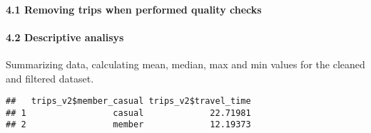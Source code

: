 \documentclass[
]{article}
\newenvironment{Shaded}{\begin{snugshade}}{\end{snugshade}}
\newcommand{\AttributeTok}[1]{\textcolor[rgb]{0.13,0.29,0.53}{#1}}
\newcommand{\DecValTok}[1]{\textcolor[rgb]{0.00,0.00,0.81}{#1}}
\newcommand{\FunctionTok}[1]{\textcolor[rgb]{0.13,0.29,0.53}{\textbf{#1}}}
\newcommand{\NormalTok}[1]{#1}
\newcommand{\OtherTok}[1]{\textcolor[rgb]{0.56,0.35,0.01}{#1}}
\newcommand{\SpecialCharTok}[1]{\textcolor[rgb]{0.81,0.36,0.00}{\textbf{#1}}}
\newcommand{\StringTok}[1]{\textcolor[rgb]{0.31,0.60,0.02}{#1}}
\begin{document}
\hypertarget{removing-trips-when-performed-quality-checks}{%
\paragraph{4.1 Removing trips when performed quality
checks}\label{removing-trips-when-performed-quality-checks}}

\begin{Shaded}
\end{Shaded}

\hypertarget{descriptive-analisys}{%
\paragraph{4.2 Descriptive analisys}\label{descriptive-analisys}}

Summarizing data, calculating mean, median, max and min values for the
cleaned and filtered dataset.

\begin{Shaded}
\end{Shaded}

\begin{verbatim}
##   trips_v2$member_casual trips_v2$travel_time
## 1                 casual             22.71981
## 2                 member             12.19373
\end{verbatim}

\begin{Shaded}
\end{Shaded}
\end{document}
